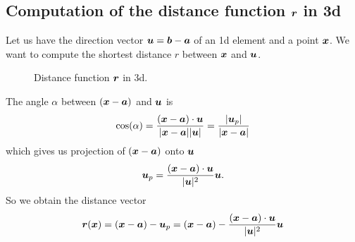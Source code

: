 \subsection{Computation of the distance function $\vc r$ in 3d}
Let us have the direction vector $\vc u = \vc b - \vc a$ of an 1d element and a point $\vc x$.
We want to compute the shortest distance $r$ between $\vc x$ and $\vc u$.
%
\begin{figure}[!htb]
  \centering
  \def\svgwidth{0.5\textwidth}
  
  \caption{Distance function $\vc r$ in 3d.}
  \label{fig:logo_flow123d}
\end{figure}
%
The angle $\alpha$ between $(\vc x - \vc a)$ and $\vc u$ is 
\[
\cos(\alpha) = \frac{(\vc x - \vc a)\cdot\vc u}{\abs{\vc x - \vc a}\abs{\vc u}} = \frac{\abs{\vc u_p}}{\abs{\vc x - \vc a}}
\]
which gives us projection of $(\vc x-\vc a)$ onto $\vc u$
\[
\vc u_p = \frac{(\vc x - \vc a)\cdot\vc u}{\abs{\vc u}^2} \vc u.
\]
So we obtain the distance vector
\[
  \vc r(\vc x) = (\vc x - \vc a) - \vc u_p = (\vc x - \vc a) - \frac{(\vc x - \vc a)\cdot\vc u}{\abs{\vc u}^2} \vc u
\]



